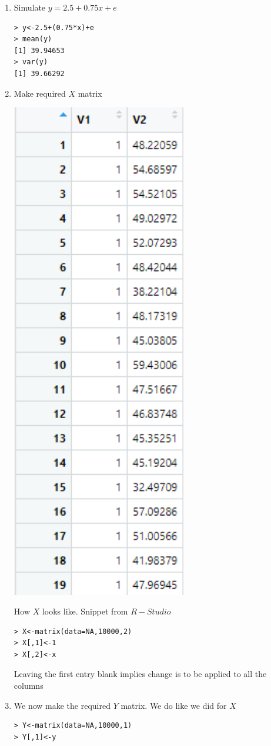 \documentclass[notoc]{tufte-book}
\begin{document}
\begin{enumerate}
\begin{lstlisting}
[1] 24.90584
> de<-density(e)
> plot(de)
\end{lstlisting}
\item Simulate $y=2.5+0.75x+e$
\begin{lstlisting}
> y<-2.5+(0.75*x)+e
> mean(y)
[1] 39.94653
> var(y)
[1] 39.66292
\end{lstlisting}
\item Make required $X$ matrix
\begin{marginfigure}
    \centering
    \includegraphics[width=0.6\textwidth]{"c2s1p2.png"}
    \caption{How $X$ looks like. Snippet from $R-Studio$}
\end{marginfigure}
\begin{lstlisting}
> X<-matrix(data=NA,10000,2)
> X[,1]<-1
> X[,2]<-x
\end{lstlisting}
Leaving the first entry blank implies change is to be applied to all the columns
\item We now make the required  $Y$ matrix. We do like we did for $X$
\begin{lstlisting}
> Y<-matrix(data=NA,10000,1)
> Y[,1]<-y
\end{lstlisting}
\end{enumerate}
\end{document}
